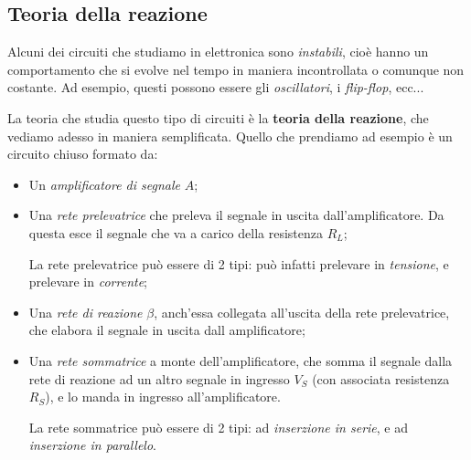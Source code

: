 \documentclass[a4paper,11pt]{article}
\begin{document}
\subsection{Teoria della reazione}
Alcuni dei circuiti che studiamo in elettronica sono \textit{instabili}, cioè hanno un comportamento che si evolve nel tempo in maniera incontrollata o comunque non costante. Ad esempio, questi possono essere gli \textit{oscillatori}, i \textit{flip-flop}, ecc...

La teoria che studia questo tipo di circuiti è la \textbf{teoria della reazione}, che vediamo adesso in maniera semplificata. Quello che prendiamo ad esempio è un circuito chiuso formato da:
\begin{itemize}
	\item Un \textit{amplificatore di segnale} $ A$;
	\item Una \textit{rete prelevatrice} che preleva il segnale in uscita dall'amplificatore. Da questa esce il segnale che va a carico della resistenza $R_L$;

		La rete prelevatrice può essere di 2 tipi: può infatti prelevare in \textit{tensione}, e prelevare in \textit{corrente};
	\item Una \textit{rete di reazione} $\beta$, anch'essa collegata all'uscita della rete prelevatrice, che elabora il segnale in uscita dall amplificatore;
	\item Una \textit{rete sommatrice} a monte dell'amplificatore, che somma il segnale dalla rete di reazione ad un altro segnale in ingresso $V_S$ (con associata resistenza $R_S$), e lo manda in ingresso all'amplificatore.

		La rete sommatrice può essere di 2 tipi: ad \textit{inserzione in serie}, e ad \textit{inserzione in parallelo}.
\end{itemize}
\end{document}
